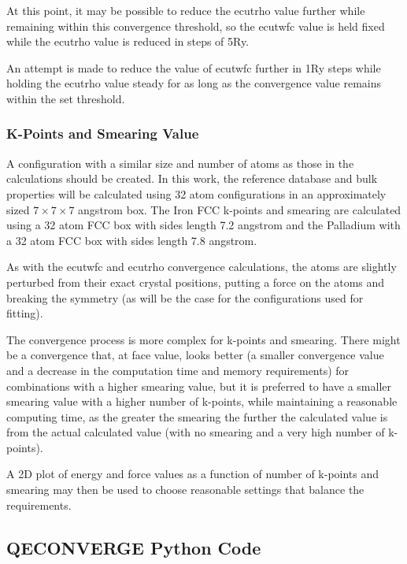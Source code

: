 At this point, it may be possible to reduce the ecutrho value further while remaining within this convergence threshold, so the ecutwfc value is held fixed while the ecutrho value is reduced in steps of 5Ry.

An attempt is made to reduce the value of ecutwfc further in 1Ry steps while holding the ecutrho value steady for as long as the convergence value remains within the set threshold.

\subsubsection{K-Points and Smearing Value}

A configuration with a similar size and number of atoms as those in the calculations should be created.  In this work, the reference database and bulk properties will be calculated using 32 atom configurations in an approximately sized $7 \times 7 \times 7$ angstrom box.  The Iron FCC k-points and smearing are calculated using a 32 atom FCC box with sides length 7.2 angstrom and the Palladium with a 32 atom FCC box with sides length 7.8 angstrom.

As with the ecutwfc and ecutrho convergence calculations, the atoms are slightly perturbed from their exact crystal positions, putting a force on the atoms and breaking the symmetry (as will be the case for the configurations used for fitting). 

The convergence process is more complex for k-points and smearing.  There might be a convergence that, at face value, looks better (a smaller convergence value and a decrease in the computation time and memory requirements) for combinations with a higher smearing value, but it is preferred to have a smaller smearing value with a higher number of k-points, while maintaining a reasonable computing time, as the greater the smearing the further the calculated value is from the actual calculated value (with no smearing and a very high number of k-points).

A 2D plot of energy and force values as a function of number of k-points and smearing may then be used to choose reasonable settings that balance the requirements.







\FloatBarrier
\subsection{QECONVERGE Python Code}
\label{code:qeconverge}

